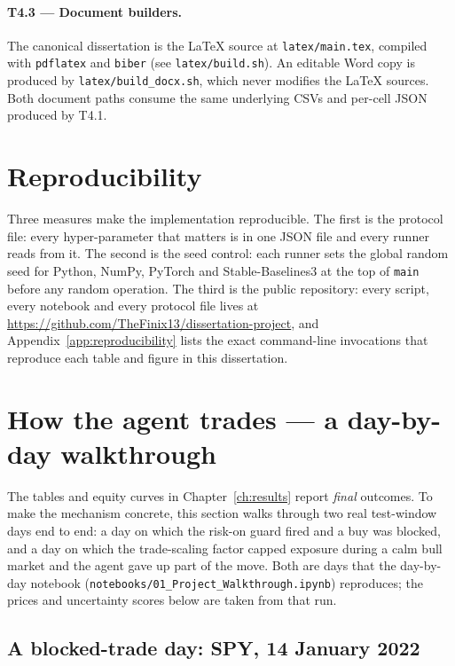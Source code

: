 \paragraph{T4.3 --- Document builders.} The canonical dissertation is the LaTeX source at \texttt{latex/main.tex}, compiled with \texttt{pdflatex} and \texttt{biber} (see \texttt{latex/build.sh}). An editable Word copy is produced by \texttt{latex/build\_docx.sh}, which never modifies the LaTeX sources. Both document paths consume the same underlying CSVs and per-cell JSON produced by T4.1.

\section{Reproducibility}
\label{sec:reproducibility_implementation}

Three measures make the implementation reproducible. The first is the protocol file: every hyper-parameter that matters is in one JSON file and every runner reads from it. The second is the seed control: each runner sets the global random seed for Python, NumPy, PyTorch and Stable-Baselines3 at the top of \texttt{main} before any random operation. The third is the public repository: every script, every notebook and every protocol file lives at \url{https://github.com/TheFinix13/dissertation-project}, and Appendix~\ref{app:reproducibility} lists the exact command-line invocations that reproduce each table and figure in this dissertation.

\section{How the agent trades --- a day-by-day walkthrough}
\label{sec:day_by_day_walkthrough}

The tables and equity curves in Chapter~\ref{ch:results} report \emph{final} outcomes. To make the mechanism concrete, this section walks through two real test-window days end to end: a day on which the risk-on guard fired and a buy was blocked, and a day on which the trade-scaling factor capped exposure during a calm bull market and the agent gave up part of the move. Both are days that the day-by-day notebook (\texttt{notebooks/01\_Project\_Walkthrough.ipynb}) reproduces; the prices and uncertainty scores below are taken from that run.

\subsection{A blocked-trade day: SPY, 14 January 2022}
\label{sec:walkthrough_spy_blocked}

